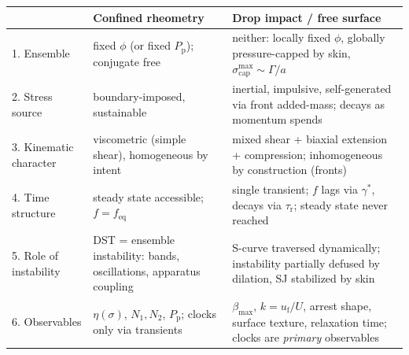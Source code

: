 \documentclass[11pt]{article}
\begin{document}
\begin{center}
\small
\begin{tabular}{p{} p{} p{}}
\hline
 & \textbf{Confined rheometry} & \textbf{Drop impact / free surface} \\
\hline
1. Ensemble & fixed $\phi$ (or fixed $P_{\mathrm{p}}$); conjugate free & neither: locally fixed $\phi$, globally pressure-capped by skin, $\sigma_{\mathrm{cap}}^{\max}\!\sim\!\Gamma/a$ \\
2. Stress source & boundary-imposed, sustainable & inertial, impulsive, self-generated via front added-mass; decays as momentum spends \\
3. Kinematic character & viscometric (simple shear), homogeneous by intent & mixed shear + biaxial extension + compression; inhomogeneous by construction (fronts) \\
4. Time structure & steady state accessible; $f=f_{\mathrm{eq}}$ & single transient; $f$ lags via $\gamma^{*}$, decays via $\tau_{\mathrm{r}}$; steady state never reached \\
5. Role of instability & DST = ensemble instability: bands, oscillations, apparatus coupling & S-curve traversed dynamically; instability partially defused by dilation, SJ stabilized by skin \\
6. Observables & $\eta(\sigma)$, $N_1, N_2$, $P_{\mathrm{p}}$; clocks only via transients & $\beta_{\max}$, $k=u_{\mathrm{f}}/U$, arrest shape, surface texture, relaxation time; clocks are \emph{primary} observables \\
\hline
\end{tabular}
\end{center}
\end{document}
